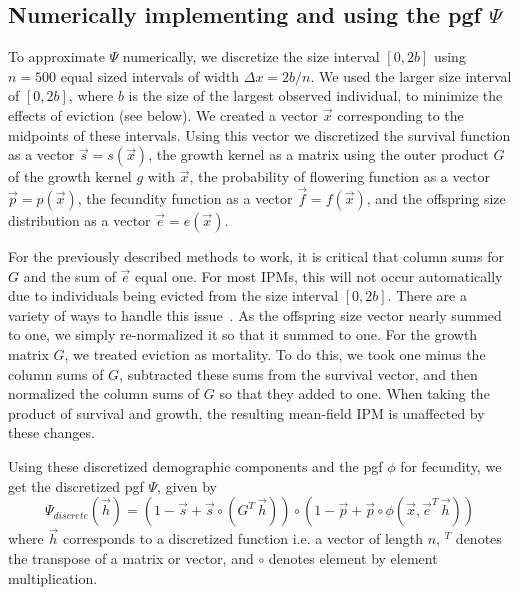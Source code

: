 \documentclass[12pt]{amsart}\usepackage[]{graphicx}\usepackage[]{color}
\begin{document}
\subsection*{Numerically implementing and using the pgf $\Psi$}

To approximate $\Psi$ numerically, we discretize the size interval $[0, 2b]$ using $n=500$ equal sized intervals of width $\Delta x=2b/n$. We used the larger size interval of $[0, 2b]$, where $b$ is the size of the largest observed individual, to minimize the effects of eviction (see below). We created a vector $\vec x$ corresponding to the midpoints of these intervals. Using this vector we discretized the survival function as a vector $\vec s=s(\vec x)$, the growth kernel as a matrix using the outer product $G$ of the growth kernel $g$ with $\vec x$, the probability of flowering function as a vector $\vec p=p(\vec x)$, the fecundity function as a vector $\vec f=f(\vec x)$, and the offspring size distribution as a vector $\vec e=e(\vec x)$.

For the previously described methods to work, it is critical that column sums for $G$ and the sum of $\vec e$ equal one. For most IPMs, this will not occur automatically due to individuals being evicted from the size interval $[0, 2b]$. There are a variety of ways to handle this issue~\citep{williams-etal-12}. As the offspring size vector nearly summed to one,  we simply re-normalized it so that it summed to one. For the growth matrix $G$, we treated eviction as mortality. To do this, we took one minus the column sums of $G$, subtracted these sums from the survival vector, and then normalized the column sums of $G$ so that they added to one. When taking the product of survival and growth, the resulting mean-field IPM is unaffected by these changes.

Using these discretized demographic components and the pgf $\phi$ for fecundity, we get the discretized pgf $\Psi$, given by
\[
\Psi_{discrete}(\vec h)=(1-\vec s+\vec s\circ (G^T\, \vec h))\circ(1-\vec p+\vec p\circ \phi(\vec x, \vec e^T\, \vec h))
\]
where $\vec h$ corresponds to a discretized function i.e. a vector of length $n$, $^T$ denotes the transpose of a matrix or vector,  and $\circ$ denotes element by element multiplication.
\end{document}
